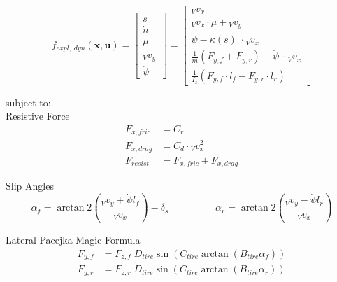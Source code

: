 \documentclass[
a4paper, %
10pt, %
notitlepage,
english]{CSUniSchoolLabReport}
\begin{document}
\begin{equation}
	f_{expl,\;dyn}(\mathbf{x}, \mathbf{u}) =
	\left[\begin{array}{c}

		\dot{s} \\

		\dot{n} \\

		\dot{\mu} \\

		{}_V\dot{v}_y \\

		\ddot{\psi}\;\;\;

	\end{array}\right] =
	\left[\begin{array}{c}

		{}_V v_x\\

		{}_V v_x \cdot \mu + {}_V v_y \\

		\dot{\psi} - \kappa(s)\;\cdot {}_V v_x  \\

		\frac{1}{m}  \left( F_{y, f} + F_{y, r} \right) - \dot{\psi}\;\cdot {}_V v_x \\

		\frac{1}{I_z}  \left(  F_{y, f} \cdot l_f - F_{y, r} \cdot l_r \right)
	\end{array}\right]
\end{equation}

subject to:\\

Resistive Force
\begin{align}
	F_{x, fric} &= C_r \\
	F_{x, drag} &= C_{d} \cdot {}_V v^2_x \\
	F_{resist} &= F_{x, fric} + F_{x, drag}
\end{align}

Slip Angles
\begin{equation}
	\alpha_f = \arctan2\left(\frac{{}_Vv_y + \dot{\psi} l_f}{{}_Vv_x}\right) - \delta_s
	\hspace{2cm}
	\alpha_r = \arctan2\left(\frac{{}_Vv_y - \dot{\psi} l_r}{{}_Vv_x}\right)
\end{equation}

Lateral Pacejka Magic Formula
\begin{align}
	F_{y, f} &= F_{z, f} \; D_{tire} \sin\left(C_{tire} \arctan(B_{tire}\alpha_f)\right) \\
	F_{y, r} &= F_{z, r} \; D_{tire} \sin\left(C_{tire} \arctan(B_{tire}\alpha_r)\right)
\end{align}
\end{document}
